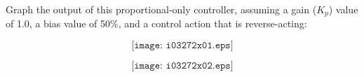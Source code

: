 

Graph the output of this proportional-only controller, assuming a gain ($K_p$) value of 1.0, a bias value of 50\%, and a control action that is reverse-acting:

$$\texttt{[image: i03272x01.eps]}$$







$$\texttt{[image: i03272x02.eps]}$$












